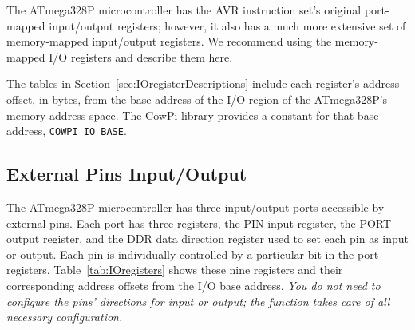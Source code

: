 The ATmega328P microcontroller has the AVR instruction set's original port-mapped input/output registers;
however, it also has a much more extensive set of memory-mapped input/output registers.
We recommend using the memory-mapped I/O registers and describe them here.

The tables in Section~\ref{sec:IOregisterDescriptions} include each register's address offset, in bytes, from the base address of the I/O region of the ATmega328P's memory address space.
The CowPi library provides a constant for that base address, \lstinline{COWPI_IO_BASE}.

\subsection{External Pins Input/Output}

The ATmega328P microcontroller has three input/output ports accessible by external pins.
Each port has three registers, the PIN input register, the PORT output register, and the DDR data direction register used to set each pin as input or output.
Each pin is individually controlled by a particular bit in the port registers.
Table~\ref{tab:IOregisters} shows these nine registers and their corresponding address offsets from the I/O base address.
\textit{You do not need to configure the pins' directions for input or output;
the  function takes care of all necessary configuration.}

